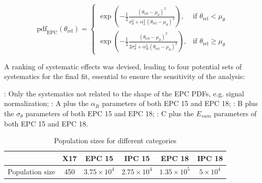 \begin{refsection}
        \begin{equation}
        \label{eq:X17:EPC:theta}
            \text{pdf}_{\text{EPC}}(\theta_{\text{rel}}) = 
            \begin{cases}
                \exp\left(-\frac{1}{2} \frac{(\theta_{\text{rel}} - \mu_{\theta})^2}{\sigma_{\theta}^2+\alpha_L^2(\theta_{\text{rel}} - \mu_{\theta})^2}\right), & \text{if } \theta_{\text{rel}} < \mu_{\theta} \\
                \exp\left(-\frac{1}{2} \frac{(\theta_{\text{rel}} - \mu_{\theta})^2}{2\sigma_{\theta}^2+\alpha_R^2(\theta_{\text{rel}} - \mu_{\theta})^2}\right), & \text{if } \theta_{\text{rel}} \geq \mu_{\theta} 
            \end{cases}
        \end{equation}

        \noindent
        A ranking of systematic effects was devised, leading to four potential sets of systematics for the final fit, essential to ensure the sensitivity of the analysis:
        \begin{outline}
            \1[\textbf{A}]: Only the systematics not related to the shape of the EPC PDFs, e.g. signal normalization;
            \1[\textbf{B}]: A plus the $\alpha_R$ parameters of both EPC 15 and EPC 18;
            \1[\textbf{C}]: B plus the $\sigma_{\theta}$ parameters of both EPC 15 and EPC 18;
            \1[\textbf{D}]: C plus the $E_{sum}$ parameters of both EPC 15 and EPC 18.
        \end{outline}

        \begin{table}[htbp]
            \centering
            \caption{Population sizes for different categories}
            \begin{tabular}{|c|c|c|c|c|c|}
                \hline
                & X17 & EPC 15 & IPC 15 & EPC 18 & IPC 18 \\
                \hline
                Population size & 450 & $3.75 \times 10^4$ & $2.75 \times 10^4$ & $1.35 \times 10^5$ & $5 \times 10^4$ \\
                \hline
            \end{tabular}
            \label{tab:X17:populations}
        \end{table}


\end{refsection}
